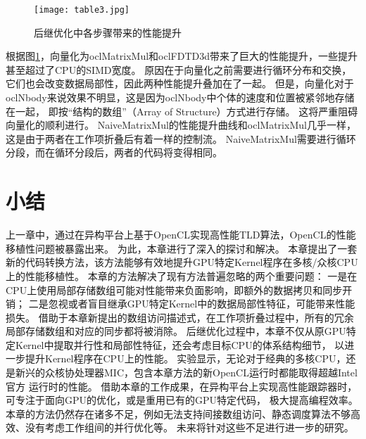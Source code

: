 \begin{figure}[htb]
	\centering
 	\texttt{[image: table3.jpg]}
 	\caption{后继优化中各步骤带来的性能提升}
 	\label{asf}
 \end{figure}

根据图\ref{asf}，向量化为oclMatrixMul和oclFDTD3d带来了巨大的性能提升，一些提升甚至超过了CPU的SIMD宽度。
原因在于向量化之前需要进行循环分布和交换，它们也会改变数据局部性，因此两种性能提升叠加在了一起。
但是，向量化对于oclNbody来说效果不明显，这是因为oclNbody中个体的速度和位置被紧邻地存储在一起，
即按``结构的数组''（Array of Structure）方式进行存储。
这将严重阻碍向量化的顺利进行。
NaiveMatrixMul的性能提升曲线和oclMatrixMul几乎一样，这是由于两者在工作项折叠后有着一样的控制流。
NaiveMatrixMul需要进行循环分段，而在循环分段后，两者的代码将变得相同。

\section{小结}
\label{kernelconclusionsec}
上一章中，通过在异构平台上基于OpenCL实现高性能TLD算法，OpenCL的性能移植性问题被暴露出来。
为此，本章进行了深入的探讨和解决。
本章提出了一套新的代码转换方法，该方法能够有效地提升GPU特定Kernel程序在多核/众核CPU上的性能移植性。
本章的方法解决了现有方法普遍忽略的两个重要问题：
一是在CPU上使用局部存储数组可能对性能带来负面影响，即额外的数据拷贝和同步开销；
二是忽视或者盲目继承GPU特定Kernel中的数据局部性特征，可能带来性能损失。
借助于本章新提出的数组访问描述式，在工作项折叠过程中，所有的冗余局部存储数组和对应的同步都将被消除。
后继优化过程中，本章不仅从原GPU特定Kernel中提取并行性和局部性特征，还会考虑目标CPU的体系结构细节，
以进一步提升Kernel程序在CPU上的性能。
实验显示，无论对于经典的多核CPU，还是新兴的众核协处理器MIC，包含本章方法的新OpenCL运行时都能取得超越Intel官方
运行时的性能。
借助本章的工作成果，在异构平台上实现高性能跟踪器时，可专注于面向GPU的优化，或是重用已有的GPU特定代码，
极大提高编程效率。
本章的方法仍然存在诸多不足，例如无法支持间接数组访问、静态调度算法不够高效、没有考虑工作组间的并行优化等。
未来将针对这些不足进行进一步的研究。
 
